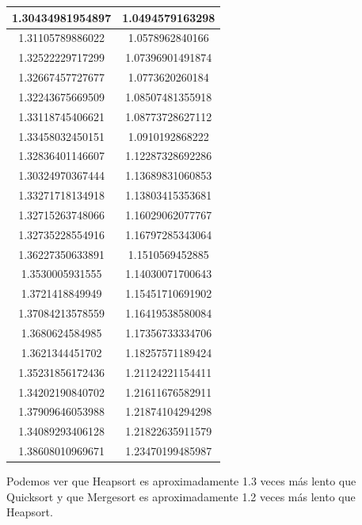 \documentclass{article}
\begin{document}
\begin{longtable}{|c||c|}
			1.30434981954897	&  1.0494579163298  \\ \hline
			1.31105789886022	&  1.0578962840166  \\ \hline
			1.32522229717299	&  1.07396901491874  \\ \hline
			1.32667457727677	&  1.0773620260184  \\ \hline
			1.32243675669509	&  1.08507481355918  \\ \hline
			1.33118745406621	&  1.08773728627112  \\ \hline
			1.33458032450151	&  1.0910192868222  \\ \hline
			1.32836401146607	&  1.12287328692286  \\ \hline
			1.30324970367444	&  1.13689831060853  \\ \hline
			1.33271718134918	&  1.13803415353681  \\ \hline
			1.32715263748066	&  1.16029062077767  \\ \hline
			1.32735228554916	&  1.16797285343064  \\ \hline
			1.36227350633891	&  1.1510569452885  \\ \hline
			1.3530005931555	    &  1.14030071700643  \\ \hline
			1.3721418849949	    &  1.15451710691902  \\ \hline
			1.37084213578559	&  1.16419538580084  \\ \hline
			1.3680624584985	    &  1.17356733334706  \\ \hline
			1.3621344451702	    &  1.18257571189424  \\ \hline
			1.35231856172436	&  1.21124221154411  \\ \hline
			1.34202190840702	&  1.21611676582911  \\ \hline
			1.37909646053988	&  1.21874104294298  \\ \hline
			1.34089293406128	&  1.21822635911579  \\ \hline
			1.38608010969671	&  1.23470199485987  \\ \hline
		\end{longtable}
	Podemos ver que Heapsort es aproximadamente 1.3 veces más lento que Quicksort y que Mergesort es aproximadamente 1.2 veces más lento que Heapsort.
\end{document}
